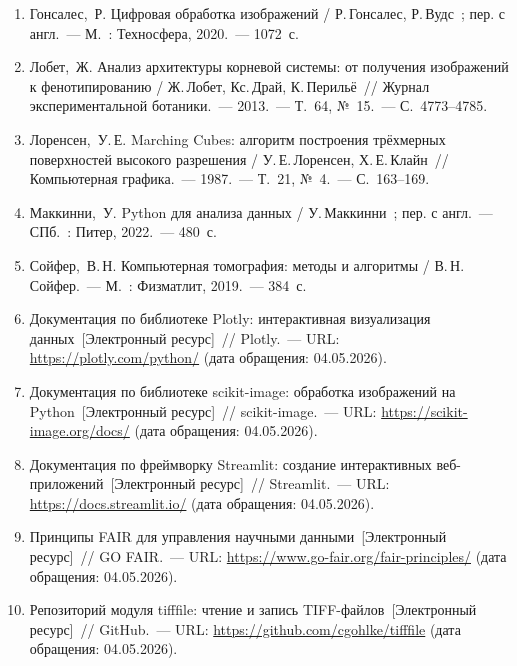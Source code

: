 \documentclass[14pt,a4paper]{extreport}
\begin{document}
\begin{enumerate}
  \item Гонсалес,~Р. Цифровая обработка изображений / Р.\,Гонсалес, Р.\,Вудс~; пер. с англ.~--- М.~: Техносфера, 2020.~--- 1072~с.
  \item Лобет,~Ж. Анализ архитектуры корневой системы: от получения изображений к фенотипированию / Ж.\,Лобет, Кс.\,Драй, К.\,Перильё~// Журнал экспериментальной ботаники.~--- 2013.~--- Т.~64, №~15.~--- С.~4773--4785.
  \item Лоренсен,~У.\,Е. Marching Cubes: алгоритм построения трёхмерных поверхностей высокого разрешения / У.\,Е.\,Лоренсен, Х.\,Е.\,Клайн~// Компьютерная графика.~--- 1987.~--- Т.~21, №~4.~--- С.~163--169.
  \item Маккинни,~У. Python для анализа данных / У.\,Маккинни~; пер. с англ.~--- СПб.~: Питер, 2022.~--- 480~с.
  \item Сойфер,~В.\,Н. Компьютерная томография: методы и алгоритмы / В.\,Н.\,Сойфер.~--- М.~: Физматлит, 2019.~--- 384~с.
  \item Документация по библиотеке Plotly: интерактивная визуализация данных~[Электронный ресурс]~// Plotly.~--- URL: \url{https://plotly.com/python/} (дата обращения: 04.05.2026).
  \item Документация по библиотеке scikit-image: обработка изображений на Python~[Электронный ресурс]~// scikit-image.~--- URL: \url{https://scikit-image.org/docs/} (дата обращения: 04.05.2026).
  \item Документация по фреймворку Streamlit: создание интерактивных веб-приложений~[Электронный ресурс]~// Streamlit.~--- URL: \url{https://docs.streamlit.io/} (дата обращения: 04.05.2026).
  \item Принципы FAIR для управления научными данными~[Электронный ресурс]~// GO FAIR.~--- URL: \url{https://www.go-fair.org/fair-principles/} (дата обращения: 04.05.2026).
  \item Репозиторий модуля tifffile: чтение и запись TIFF-файлов~[Электронный ресурс]~// GitHub.~--- URL: \url{https://github.com/cgohlke/tifffile} (дата обращения: 04.05.2026).
\end{enumerate}
\end{document}
